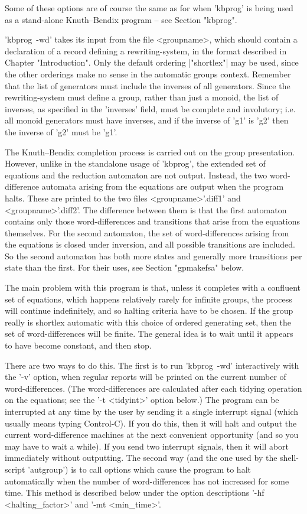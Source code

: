 Some of these options are of course the same as for when 'kbprog' is being
used as a stand-alone Knuth--Bendix program -- see Section "kbprog".

'kbprog\ -wd' takes its input from the file <groupname>, which should contain a
declaration of a record defining a rewriting-system, in the format described
in Chapter "Introduction". Only the default ordering |"shortlex"| may be used,
since the other orderings make no sense in the automatic groups context.
Remember that the list of generators must include the inverses of all
generators.  Since the rewriting-system must define a group, rather than just
a monoid, the list of inverses, as specified in the 'inverses' field, must be
complete and involutory; i.e. all monoid generators must have inverses, and if
the inverse of 'g1' is 'g2' then the inverse of 'g2' must be 'g1'.

The Knuth--Bendix completion process is carried out on the group presentation.
However, unlike in the standalone usage of 'kbprog', the extended set of
equations and the reduction automaton are not output. Instead, the two
word-difference automata arising from the equations are output when the program
halts. These are printed to the two files <groupname>'.diff1' and
<groupname>'.diff2'. The difference between them is that the first automaton
contains only those word-differences and transitions that arise from the
equations themselves. For the second automaton, the set of word-differences
arising from the equations is closed under inversion, and all possible
transitions are included. So the second automaton has both more states and
generally more transitions per state than the first. For their uses, see
Section "gpmakefsa" below.

The main problem with this program is that, unless it completes with a
confluent set of equations, which happens relatively rarely for infinite groups,
the process will continue indefinitely, and so halting criteria have to be
chosen. If the group really is shortlex automatic with this choice of
ordered generating set, then the set of word-differences will be finite.
The general idea is to wait until it appears to have become constant, and
then stop.

There are two ways to do this. The first is to run 'kbprog\ -wd'
interactively with the '-v' option, when regular reports will be printed
on the current number of word-differences. (The word-differences are
calculated after each tidying operation on the equations; see the
'-t <tidyint>' option below.) The program can be interrupted at any time by the
user by sending it a single interrupt signal (which usually means typing
Control-C).  If you do this, then it will halt and output the current 
word-difference machines at the next convenient
opportunity (and so you may have to wait a while). If you send two interrupt
signals, then it will abort immediately without outputting.
The second way (and the one used by the shell-script 'autgroup') is to call
options which cause the program to halt automatically when the number of
word-differences has not increased for some time. This method is described
below under the option descriptions  '-hf <halting\_factor>' and
'-mt <min\_time>'.

